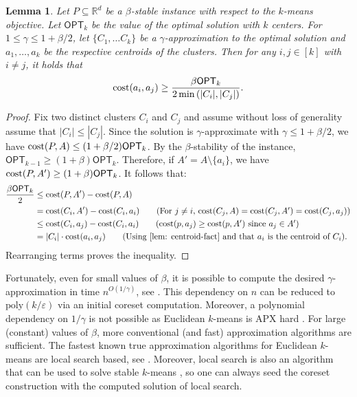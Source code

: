 \documentclass[11pt]{article}
\newtheorem{lemma}{Lemma}[section]
\theoremstyle{restate}
\theoremstyle{definition}
\newcommand{\eps}{\ensuremath{\varepsilon}}
\newcommand{\R}{\ensuremath{\mathbb{R}}}
\newcommand{\cost}{\textnormal{cost}}
\newcommand{\opt}{\ensuremath{\mathsf{OPT}}}
\begin{document}
\begin{lemma}
\label{lem: approxstability}
    Let $P \subseteq \R^d$ be a $\beta$-stable instance with respect to the $k$-means objective. Let $\opt_k$ be the value of the optimal solution with $k$ centers. For $1 \leq \gamma \leq 1 + \beta/2$, let $\{C_1, \ldots C_k \}$ be a  $\gamma$-approximation to the optimal solution and $a_1, \ldots, a_k$ be the respective centroids of the clusters. Then for any $i, j \in[k]$ with $i \neq j$, it holds that $$\cost(a_i, a_j) \geq  \frac{ \beta \opt_k}{2\min\left(|C_i|, |C_j|\right)}.$$    
\end{lemma}
\begin{proof}
    Fix two distinct clusters $C_i$ and $C_j$ and assume without loss of generality assume that $|C_i| \leq |C_j|$. Since the solution is $\gamma$-approximate with $\gamma \leq 1 + \beta/2$, we have $\cost(P,A) \leq (1+ \beta/2) \opt_k$.  By the $\beta$-stability of the instance, $\opt_{k-1} \geq (1+\beta) \opt_k$. Therefore, if $A' = A \setminus \{a_i\}$, we have $\cost(P,A') \geq (1+\beta) \opt_k$. It follows that: 
    \begin{align*}
        \frac{\beta \opt_k}{2}  &\leq \cost(P,A') - \cost(P,A)\\
        & = \cost(C_i,A') - \cost(C_i, a_i) \tag{For $j \neq i$,  $\cost(C_j, A) = \cost(C_j, A') = \cost(C_j,a_j)$}\\
        & \leq \cost(C_i, a_j) - \cost(C_i, a_i) \tag{$\cost(p,a_j) \geq \cost(p, A')$ since $a_j \in A'$}\\
        & =|C_i| \cdot \cost(a_i, a_j)\tag{Using \Cref{lem: centroid-fact} and that $a_i$ is the centroid of $C_i$}.
    \end{align*}
    Rearranging terms proves the inequality.
\end{proof}


Fortunately, even for small values of $\beta$, it is possible to compute the desired $\gamma$-approximation in time $n^{O(1/\gamma)}$, see \cite{ABS10}. This dependency on $n$ can be reduced to $\text{poly}(k/\eps)$ via an initial coreset computation. Moreover, a polynomial dependency on $1/\gamma$ is not possible as Euclidean $k$-means is APX hard \cite{Cohen-AddadSL21}. For large (constant) values of $\beta$, more conventional (and fast) approximation algorithms are sufficient. The fastest known true approximation algorithms for Euclidean $k$-means are local search based, see \cite{ChooGPR20,KMNPSW04,LattanziS19}. Moreover, local search is also an algorithm that can be used to solve stable $k$-means \cite{Cohen-AddadS17}, so one can always seed the coreset construction with the computed solution of local search.
\end{document}
